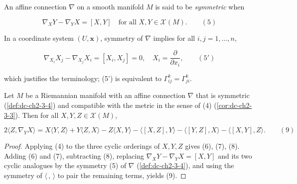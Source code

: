 \begin{definition}
  \label{def:dc-ch2-3-4}
  \leanok
  An affine connection $\nabla$ on a smooth manifold $M$ is said to be \emph{symmetric}
  when
  
  $$
  \nabla_X Y-\nabla_Y X=[X,Y]\quad\text{for all }X,Y\in\mathcal{X}(M).\qquad(5)
  $$
\end{definition}

\begin{remark}[Remark 3.5]
  \label{rem:dc-ch2-3-5}
  In a coordinate system $(U,\mathbf{x})$, symmetry of $\nabla$ implies for all
  $i,j=1,\dots,n$,
  
  $$
  \nabla_{X_i}X_j-\nabla_{X_j}X_i=[X_i,X_j]=0,\quad X_i=\frac{\partial}{\partial x_i},\qquad(5')
  $$
  
  which justifies the terminology; (5') is equivalent to $\Gamma_{ij}^k=\Gamma_{ji}^k$.
\end{remark}

\begin{lemma}
  \label{lem:dc-ch2-3-6-koszul}
  \leanok
  Let $M$ be a Riemannian manifold with an affine connection $\nabla$ that is
  symmetric (\cref{def:dc-ch2-3-4}) and compatible with the metric in the sense of
  (4) (\cref{cor:dc-ch2-3-3}). Then for all $X,Y,Z\in\mathcal{X}(M)$,

  $$
  2\langle Z,\nabla_Y X\rangle=X\langle Y,Z\rangle+Y\langle Z,X\rangle-Z\langle X,Y\rangle-\langle[X,Z],Y\rangle-\langle[Y,Z],X\rangle-\langle[X,Y],Z\rangle.\qquad(9)
  $$
\end{lemma}
\begin{proof}
  \leanok
  Applying (4) to the three cyclic orderings of $X,Y,Z$ gives (6), (7), (8).
  Adding (6) and (7), subtracting (8), replacing
  $\nabla_X Y-\nabla_Y X=[X,Y]$ and its two cyclic analogues by the symmetry (5) of
  $\nabla$ (\cref{def:dc-ch2-3-4}), and using the symmetry of $\langle\,,\,\rangle$
  to pair the remaining terms, yields (9).
\end{proof}

